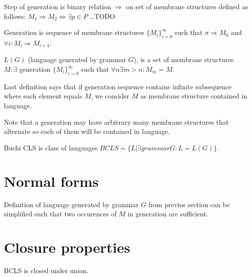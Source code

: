 \documentclass[a4paper,10pt]{article}
\begin{document}
\begin{definicia}
  Step of generation is binary relation $\Rightarrow$ on set of membrane structures defined as follows:
  $M_1\Rightarrow M_2\Leftrightarrow \exists p\in P$ \dots TODO %
\end{definicia}

\begin{definicia}
  Generation is sequence of membrane structures $\{M_i\}_{i=0}^\infty$ such that $\sigma\Rightarrow M_0$ and $\forall i: M_i\Rightarrow M_{i+1}$.
\end{definicia}

\begin{definicia}
  $L(G)$ (language generated by grammar $G$), is a set of membrane structures $M: \exists$ generation $\{M_i\}_{i=0}^\infty$ such that $\forall n\exists m>n: M_m=M$.
\end{definicia}

\begin{poznamka}
  Last definition says that if generation sequence contains infinite subsequence where each element equals $M$, we consider $M$ as membrane structure contained in language.
\end{poznamka}

\begin{poznamka}
  Note that a generation may have arbitrary many membrane structures that alternate so each of them will be contained in language.
\end{poznamka}

\begin{definicia}
  Buchi CLS is class of languages $BCLS=\{L|\exists grammar G: L=L(G)\}$.
\end{definicia}

\section{Normal forms}
Definition of language generated by grammar $G$ from previos section can be simplified such that two occurences of $M$ in generation are sufficient.

\section{Closure properties}
\begin{veta}
  BCLS is closed under union.
\end{veta}
\end{document}
